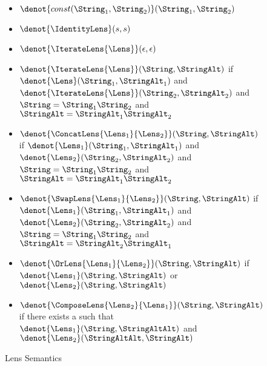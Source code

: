 \begin{figure}[b]
\centering
\begin{itemize}
\item $\denot{const(\String_1,\String_2)}(\String_1,\String_2)$

\item $\denot{\IdentityLens}(s,s)$

\item $\denot{\IterateLens{\Lens}}(\epsilon,\epsilon)$

\item $\denot{\IterateLens{\Lens}}(\String,\StringAlt)$
if $\denot{\Lens}(\String_1,\StringAlt_1)$
and $\denot{\IterateLens{\Lens}}(\String_2,\StringAlt_2)$
and $\String=\String_1\String_2$
and $\StringAlt=\StringAlt_1\StringAlt_2$

\item $\denot{\ConcatLens{\Lens_1}{\Lens_2}}(\String,\StringAlt)$
if $\denot{\Lens_1}(\String_1,\StringAlt_1)$
and $\denot{\Lens_2}(\String_2,\StringAlt_2)$
and $\String=\String_1\String_2$
and $\StringAlt=\StringAlt_1\StringAlt_2$

\item $\denot{\SwapLens{\Lens_1}{\Lens_2}}(\String,\StringAlt)$
if $\denot{\Lens_1}(\String_1,\StringAlt_1)$
and $\denot{\Lens_2}(\String_2,\StringAlt_2)$
and $\String=\String_1\String_2$
and $\StringAlt=\StringAlt_2\StringAlt_1$

\item $\denot{\OrLens{\Lens_1}{\Lens_2}}(\String,\StringAlt)$
if $\denot{\Lens_1}(\String,\StringAlt)$
or $\denot{\Lens_2}(\String,\StringAlt)$

\item $\denot{\ComposeLens{\Lens_2}{\Lens_1}}(\String,\StringAlt)$
if there exists a \StringAltAlt{} such that
$\denot{\Lens_1}(\String,\StringAltAlt)$
and $\denot{\Lens_2}(\StringAltAlt,\StringAlt)$
\end{itemize}
\caption{Lens Semantics }
\label{fig:lens-semantics}
\end{figure}
